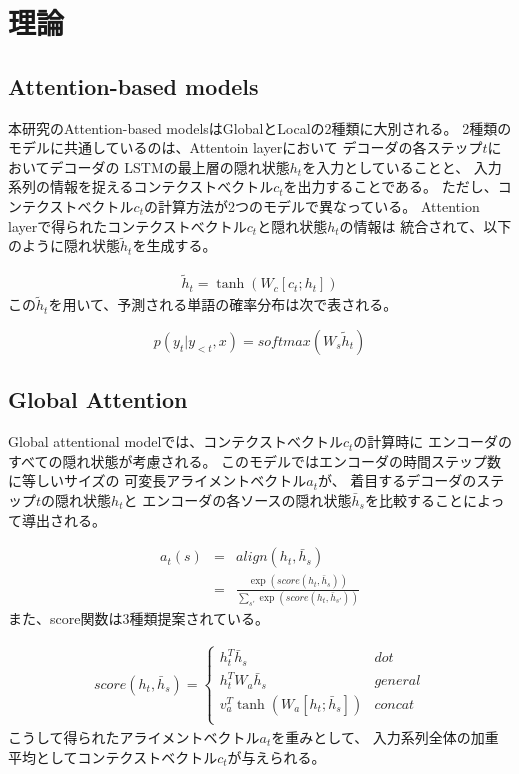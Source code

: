 \documentclass{jsarticle}
\begin{document}
\section{理論}
\subsection{Attention-based models}
本研究のAttention-based modelsはGlobalとLocalの2種類に大別される。
2種類のモデルに共通しているのは、Attentoin layerにおいて
デコーダの各ステップ$t$においてデコーダの
LSTMの最上層の隠れ状態$h_t$を入力としていることと、
入力系列の情報を捉えるコンテクストべクトル$c_t$を出力することである。
ただし、コンテクストべクトル$c_t$の計算方法が2つのモデルで異なっている。
Attention layerで得られたコンテクストべクトル$c_t$と隠れ状態$h_t$の情報は
統合されて、以下のように隠れ状態$\tilde h_t$を生成する。

\begin{eqnarray}
  \tilde h_t = \tanh(W_c[c_t;h_t])
\end{eqnarray}
この$\tilde h_t$を用いて、予測される単語の確率分布は次で表される。

\begin{equation}
p(y_t|y_{<t},x) = softmax(W_s\tilde h_t)  
\end{equation}

\subsection{Global Attention}
Global attentional modelでは、コンテクストべクトル$c_t$の計算時に
エンコーダのすべての隠れ状態が考慮される。
このモデルではエンコーダの時間ステップ数に等しいサイズの
可変長アライメントベクトル$a_t$が、
着目するデコーダのステップ$t$の隠れ状態$h_t$と
エンコーダの各ソースの隠れ状態$\bar h_s$を比較することによって導出される。

\begin{eqnarray}
  a_t(s) &=& align(h_t,\bar h_s) \\
  &=& \frac{\exp(score(h_t,\bar h_s))}{\sum_{s'}\exp(score(h_t,\bar h_{s'}))}
\end{eqnarray}
また、score関数は3種類提案されている。

\begin{eqnarray}
  score(h_t,\bar h_s) = \begin{cases}
    h_t^T\bar h_s & dot \\
    h_t^TW_a\bar h_s & general \\
    v_a^T \tanh(W_a [h_t;\bar h_s]) & concat \\
  \end{cases}
\end{eqnarray}
こうして得られたアライメントベクトル$a_t$を重みとして、
入力系列全体の加重平均としてコンテクストベクトル$c_t$が与えられる。
\end{document}
